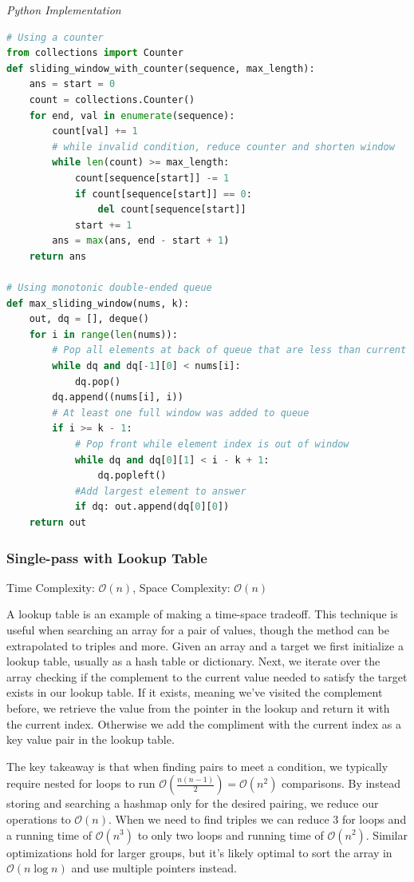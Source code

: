 \documentclass{article}
\newcommand{\bigO}{\mathcal{O}}
\begin{document}
\vspace{8pt} \emph{Python Implementation}
\begin{lstlisting}[language=Python]
# Using a counter
from collections import Counter
def sliding_window_with_counter(sequence, max_length):
    ans = start = 0
    count = collections.Counter()
    for end, val in enumerate(sequence):
        count[val] += 1
        # while invalid condition, reduce counter and shorten window 
        while len(count) >= max_length:
            count[sequence[start]] -= 1
            if count[sequence[start]] == 0:
                del count[sequence[start]]
            start += 1
        ans = max(ans, end - start + 1)
    return ans
    
# Using monotonic double-ended queue
def max_sliding_window(nums, k):
    out, dq = [], deque()
    for i in range(len(nums)):
        # Pop all elements at back of queue that are less than current element
        while dq and dq[-1][0] < nums[i]:
            dq.pop()
        dq.append((nums[i], i))
        # At least one full window was added to queue
        if i >= k - 1:
            # Pop front while element index is out of window
            while dq and dq[0][1] < i - k + 1:
                dq.popleft()
            #Add largest element to answer
            if dq: out.append(dq[0][0])
    return out
\end{lstlisting}

    \subsubsection{Single-pass with Lookup Table}
    Time Complexity: $\bigO(n)$, Space Complexity: $\bigO(n)$
    
    A lookup table is an example of making a time-space tradeoff. This technique is useful when searching an array for a pair of values, though the method can be extrapolated to triples and more. Given an array and a target we first initialize a lookup table, usually as a hash table or dictionary. Next, we iterate over the array checking if the complement to the current value needed to satisfy the target exists in our lookup table. If it exists, meaning we've visited the complement before, we retrieve the value from the pointer in the lookup and return it with the current index. Otherwise we add the compliment with the current index as a key value pair in the lookup table.

    The key takeaway is that when finding pairs to meet a condition, we typically require nested for loops to run $\bigO(\frac{n(n-1)}{2}) = \bigO(n^2)$ comparisons. By instead storing and searching a hashmap only for the desired pairing, we reduce our operations to $\bigO(n)$. When we need to find triples we can reduce 3 for loops and a running time of $\bigO(n^3)$ to only two loops and running time of $\bigO(n^2)$. Similar  optimizations hold for larger groups, but it's likely optimal to sort the array in $\bigO(n \log n)$ and use multiple pointers instead. 
\end{document}

